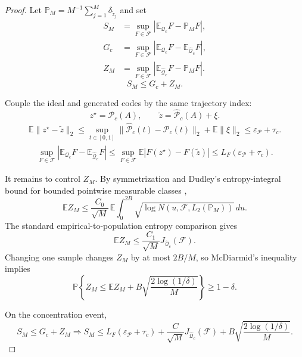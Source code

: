 \documentclass{article}
\begin{document}
\begin{proof}
	Let $\mathbb{P}_M=M^{-1}\sum_{j=1}^{M}\delta_{\tilde z_j}$ and set
	\[
	\begin{aligned}
	S_M&=
	\sup_{F\in\mathcal{F}}
	\left|
	\mathbb{E}_{\mathcal{Q}_c}F-\mathbb{P}_M F
	\right|,\\
	G_c&=
	\sup_{F\in\mathcal{F}}
	\left|
	\mathbb{E}_{\mathcal{Q}_c}F-\mathbb{E}_{\widehat{\mathcal{Q}}_c}F
	\right|,\\
	Z_M&=
	\sup_{F\in\mathcal{F}}
	\left|
	\mathbb{E}_{\widehat{\mathcal{Q}}_c}F-\mathbb{P}_M F
	\right|.
	\end{aligned}
	\]
	\[
	S_M\le G_c+Z_M .
	\]

	Couple the ideal and generated codes by the same trajectory index:
	\[
	z^\star=\mathcal{P}_c(A),\qquad
	\tilde z=\widehat{\mathcal{P}}_c(A)+\xi .
	\]
	\[
	\begin{aligned}
		\mathbb{E}\lVert z^\star-\tilde z\rVert_2
		\le
		\sup_{t\in[0,1]}
		\lVert\widehat{\mathcal{P}}_c(t)-\mathcal{P}_c(t)\rVert_2
		+
		\mathbb{E}\lVert\xi\rVert_2
		\le
		\varepsilon_{\mathcal{P}}+\tau_c .
	\end{aligned}
	\]
	\[
	\begin{aligned}
		\sup_{F\in\mathcal{F}}
		\left|
		\mathbb{E}_{\mathcal{Q}_c}F-
		\mathbb{E}_{\widehat{\mathcal{Q}}_c}F
		\right|
		\le
		\sup_{F\in\mathcal{F}}
		\mathbb{E}\left|F(z^\star)-F(\tilde z)\right|
			\le
			L_F(\varepsilon_{\mathcal{P}}+\tau_c).
	\end{aligned}
	\]

	It remains to control $Z_M$. By symmetrization and Dudley's entropy-integral bound for bounded pointwise measurable classes \citep{dudley1967sizes, vandervaart1996weak, wainwright2019high},
	\[
	\mathbb{E}Z_M
	\le
	\frac{C_0}{\sqrt{M}}\,
	\mathbb{E}
	\int_0^{2B}
	\sqrt{\log N(u,\mathcal{F},L_2(\mathbb{P}_M))}\,du .
	\]
	The standard empirical-to-population entropy comparison gives
	\[
	\mathbb{E}Z_M
	\le
	\frac{C_1}{\sqrt{M}}J_{\widehat{\mathcal{Q}}_c}(\mathcal{F}).
	\]
	Changing one sample changes $Z_M$ by at most $2B/M$, so McDiarmid's inequality implies
	\[
	\mathbb{P}\left\{
		Z_M
		\le
		\mathbb{E}Z_M
		+
		B\sqrt{\frac{2\log(1/\delta)}{M}}
	\right\}
	\ge
	1-\delta .
	\]

	On the concentration event,
	\[
	S_M\le G_c+Z_M
	\Longrightarrow
	S_M
	\le
	L_F(\varepsilon_{\mathcal{P}}+\tau_c)
	+
	\frac{C}{\sqrt{M}}J_{\widehat{\mathcal{Q}}_c}(\mathcal{F})
	+
	B\sqrt{\frac{2\log(1/\delta)}{M}} .
	\]
\end{proof}
\end{document}
